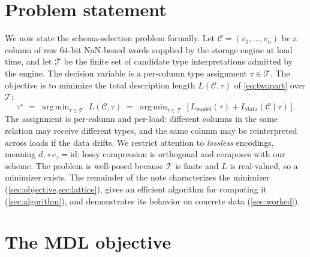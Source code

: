 \documentclass[10pt]{article}
\theoremstyle{definition}
\theoremstyle{remark}
\newcommand{\Ccal}{\mathcal{C}}
\newcommand{\Tcal}{\mathcal{T}}
\newcommand{\Lmodel}{L_{\mathrm{model}}}
\newcommand{\Ldata}{L_{\mathrm{data}}}
\DeclareMathOperator*{\argmin}{arg\,min}
\begin{document}
\section{Problem statement}\label{sec:problem}

We now state the schema-selection problem formally. Let $\Ccal =
(v_1, \ldots, v_n)$ be a column of raw $64$-bit NaN-boxed words supplied
by the storage engine at load time, and let $\Tcal$ be the finite set of
candidate type interpretations admitted by the engine. The decision
variable is a per-column type assignment $\tau \in \Tcal$. The objective
is to minimize the total description length $L(\Ccal, \tau)$ of
\cref{eq:twopart} over $\Tcal$:
\begin{equation}\label{eq:objective}
\tau^\star \;=\; \argmin_{\tau \in \Tcal} \; L(\Ccal, \tau) \;=\; \argmin_{\tau \in \Tcal} \;\bigl[\,\Lmodel(\tau) + \Ldata(\Ccal \mid \tau)\,\bigr].
\end{equation}
The assignment is per-column and per-load: different columns in the same
relation may receive different types, and the same column may be
reinterpreted across loads if the data drifts. We restrict attention to
\emph{lossless} encodings, meaning $d_\tau \circ e_\tau = \mathrm{id}$;
lossy compression is orthogonal and composes with our scheme. The problem
is well-posed because $\Tcal$ is finite and $L$ is real-valued, so a
minimizer exists. The remainder of the note characterizes the minimizer
(\cref{sec:objective,sec:lattice}), gives an efficient algorithm for
computing it (\cref{sec:algorithm}), and demonstrates its behavior on
concrete data (\cref{sec:worked}).

\section{The MDL objective}\label{sec:objective}
\end{document}
